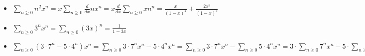 \begin{enumerate}
    \begin{itemize}
        \item $\sum_{n \ge 0} n^2x^n = x\sum_{n \ge 0}\frac{d}{dx}nx^n = x\frac{d}{dx}\sum_{n \ge 0}xn^n = \frac{x}{(1-x)^2} + \frac{2x^2}{(1-x)^3}$
        \item $\sum_{n \ge 0}3^nx^n = \sum_{n \ge 0}(3x)^n = \frac{1}{1 - 3x}$
        \item $\sum_{n \ge 0} (3\cdot 7^n - 5 \cdot 4^n)x^n = \sum_{n \ge 0} 3\cdot 7^nx^n - 5 \cdot 4^nx^n = \sum_{n \ge 0} 3\cdot 7^nx^n - \sum_{n \ge 0} 5 \cdot 4^nx^n = 3\cdot \sum_{n \ge 0} 7^nx^n - 5 \cdot\sum_{n \ge 0} 4^nx^n = 3\cdot \sum_{n \ge 0} (7x)^n - 5 \cdot\sum_{n \ge 0} (4x)^n = \frac{3}{1 - 7x} - \frac{5}{1 - 4x}$
    \end{itemize}

    

\end{enumerate}
